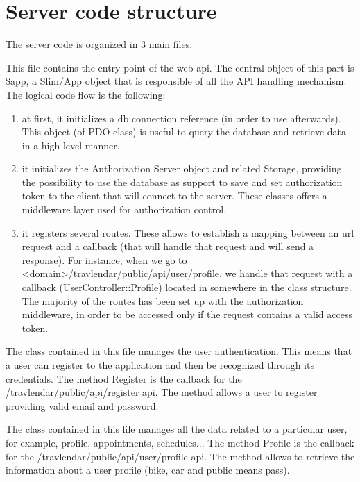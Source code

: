 \chapter{Server code structure}
The server code is organized in 3 main files:

This file contains the entry point of the web api. The central object of this part is \$app, a Slim/App object that is responsible of all the API handling mechanism. The logical code flow is the following:

\begin{enumerate}
\item at first, it initializes a db connection reference (in order to use afterwards). This object (of PDO class) is useful to query the database and retrieve data in a high level manner.
\item it initializes the Authorization Server object and related Storage, providing the possibility to use the database as support to save and set authorization token to the client that will connect to the server. These classes offers a middleware layer used for authorization control.
\item it registers several routes. These allows to establish a mapping between an url request and a callback (that will handle that request and will send a response). For instance, when we go to <domain>/travlendar/public/api/user/profile, we handle that request with a callback (UserController::Profile) located in somewhere in the class structure. The majority of the routes has been set up with the authorization middleware, in order to be accessed only if the request contains a valid access token.
\end{enumerate}

The class contained in this file manages the user authentication. This means that a user can register to the application and then be recognized through its credentials. The method Register is the callback for the /travlendar/public/api/register api. The method allows a user to register providing valid email and password.

The class contained in this file manages all the data related to a particular user, for example, profile, appointments, schedules... The method Profile is the callback for the /travlendar/public/api/user/profile api. The method allows to retrieve the information about a user profile (bike, car and public means pass).



